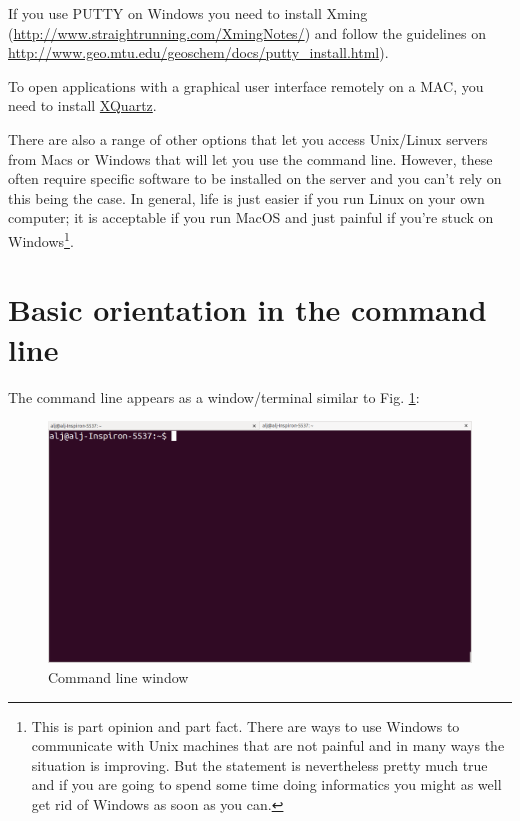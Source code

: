 \documentclass[11pt]{article}
\begin{document}
If you use PUTTY on Windows you need to install Xming
(\url{http://www.straightrunning.com/XmingNotes/}) and follow the guidelines
on \url{http://www.geo.mtu.edu/geoschem/docs/putty_install.html}).

To open applications with a graphical user interface remotely on a
MAC, you need to install \href{http://xquartz.macosforge.org/landing/}{XQuartz}.

There are also a range of other options that let you access Unix/Linux
servers from Macs or Windows that will let you use the command line. However,
these often require specific software to be installed on the server and you
can't rely on this being the case. In general, life is just easier if you run
Linux on your own computer; it is acceptable if you run MacOS and just painful
if you're stuck on Windows\footnote{This is part opinion and part fact. There are ways to use Windows to
communicate with Unix machines that are not painful and in many ways the
situation is improving. But the statement is nevertheless pretty much true
and if you are going to spend some time doing informatics you might as well
get rid of Windows as soon as you can.}.

\section{Basic orientation in the command line}
\label{sec-2}

The command line appears as a window/terminal similar to
Fig. \ref{fig:terminal}:

\begin{figure}[htb]
\centering
\includegraphics[width=14cm]{Terminal.png}
\caption{\label{fig:terminal}Command line window}
\end{figure}
\end{document}

